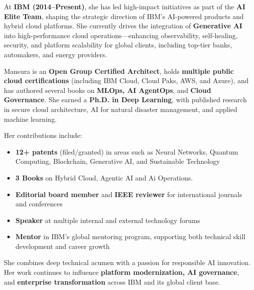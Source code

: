 \documentclass[12pt,parskip=half]{scrartcl}
\begin{document}
At \textbf{IBM (2014–Present)}, she has led high-impact initiatives as part of the \textbf{AI Elite Team}, shaping the strategic direction of IBM’s AI-powered products and hybrid cloud platforms. She currently drives the integration of \textbf{Generative AI} into high-performance cloud operations—enhancing observability, self-healing, security, and platform scalability for global clients, including top-tier banks, automakers, and energy providers.

Mansura is an \textbf{Open Group Certified Architect}, holds \textbf{multiple public cloud certifications} (including IBM Cloud, Cloud Paks, AWS, and Azure), and has authored several books on \textbf{MLOps, AI AgentOps}, and \textbf{Cloud Governance}. She earned a \textbf{Ph.D. in Deep Learning}, with published research in secure cloud architecture, AI for natural disaster management, and applied machine learning.

Her contributions include:
\begin{itemize}
    \item \textbf{12+ patents} (filed/granted) in areas such as Neural Networks, Quantum Computing, Blockchain, Generative AI, and Sustainable Technology
    \item \textbf{3 Books} on Hybrid Cloud, Agentic AI and Ai Operations.
    \item \textbf{Editorial board member} and \textbf{IEEE reviewer} for international journals and conferences
    \item \textbf{Speaker} at multiple internal and external technology forums
    \item \textbf{Mentor} in IBM’s global mentoring program, supporting both technical skill development and career growth
\end{itemize}

She combines deep technical acumen with a passion for responsible AI innovation. Her work continues to influence \textbf{platform modernization, AI governance}, and \textbf{enterprise transformation} across IBM and its global client base.


\vspace{0.3cm}
\end{document}
